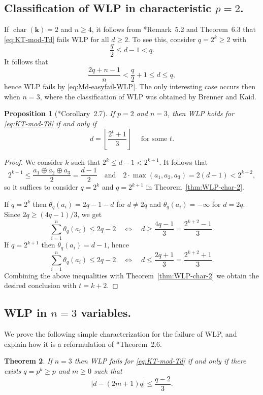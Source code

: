 \documentclass[11pt,reqno]{amsart}
\def\kk{{\mathbf k}}
\newcommand{\op}[1]{\operatorname{#1}}
\newtheorem{theorem}{Theorem}[section]
\newtheorem{proposition}[theorem]{Proposition}
\theoremstyle{definition}
\theoremstyle{remark}
\numberwithin{equation}{section}
\begin{document}
\subsection{Classification of WLP in characteristic $p=2$.}
\label{subsec:WLP-char2-constantai}

If $\op{char}(\kk)=2$ and $n\geq 4$, it follows from \cite{kus-vra}*{Remark~5.2 and Theorem~6.3} that \eqref{eq:KT-mod-Td} fails WLP for all $d\geq 2$. To see this, consider $q=2^k\geq 2$ with
\[ \frac{q}{2}\leq d-1<q.\]
It follows that
\[\frac{2q+n-1}{n}< \frac{q}{2}+1\leq d\leq q,\]
hence WLP fails by \eqref{eq:Md-easyfail-WLP}. The only interesting case occurs then when $n=3$, where the classification of WLP was obtained by Brenner and Kaid.

\begin{proposition}[\cite{bre-kai}*{Corollary~2.7}]\label{prop:WLPddd}
    If $p=2$ and $n=3$, then WLP holds for \eqref{eq:KT-mod-Td} if and only if 
    \[d=\left\lfloor \frac{2^t+1}{3}\right\rfloor\quad\text{ for some }t.\]
\end{proposition}

\begin{proof}
    We consider $k$ such that $2^k\leq d-1<2^{k+1}$. It follows that \[2^{k-1}\leq\frac{a_1\oplus a_2\oplus a_3}{2}=\frac{d-1}{2}\quad\text{and}\quad 2\cdot\max(a_1,a_2,a_3)=2(d-1)<2^{k+2},\]
    so it suffices to consider $q=2^k$ and $q=2^{k+1}$ in Theorem~\ref{thm:WLP-char-2}.

    If $q=2^k$ then $\theta_q(a_i) = 2q-1-d$ for $d\neq 2q$ and $\theta_q(a_i)=-\infty$ for $d=2q$. Since $2q\geq(4q-1)/3$, we get
    \[\sum_{i=1}^n \theta_q(a_i) \leq 2q-2 \quad\Longleftrightarrow\quad d\geq\frac{4q-1}{3}=\frac{2^{k+2}-1}{3}.\]
    If $q=2^{k+1}$ then $\theta_q(a_i)=d-1$, hence
    \[\sum_{i=1}^n \theta_q(a_i) \leq 2q-2 \quad\Longleftrightarrow\quad d\leq\frac{2q+1}{3}=\frac{2^{k+2}+1}{3}.\]
    Combining the above inequalities with Theorem~\ref{thm:WLP-char-2} we obtain the desired conclusion with $t=k+2$.
\end{proof}

\subsection{WLP in $n=3$ variables.} We prove the following simple characterization for the failure of WLP, and explain how it is a reformulation of \cite{bre-kai}*{Theorem~2.6}.

\begin{theorem}\label{thm:WLP-n=3}
    If $n=3$ then WLP fails for \eqref{eq:KT-mod-Td} if and only if there exists $q=p^k\geq p$ and $m\geq 0$ such that
    \begin{equation}\label{eq:ineq-WLP-n=3}
    |d-(2m+1)q| \leq \frac{q-2}{3}.
    \end{equation}
\end{theorem}
\end{document}
